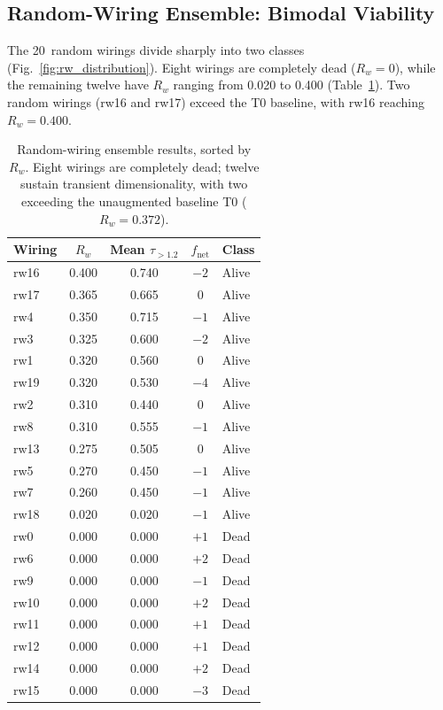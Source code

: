 \documentclass[twocolumn,showpacs,preprintnumbers,amsmath,amssymb,prd,floatfix]{revtex4-2}
\newcommand{\tauexp}{\tau_{>1.2}}
\newcommand{\Rw}{R_w}
\begin{document}
\subsection{Random-Wiring Ensemble: Bimodal Viability}

The 20~random wirings divide sharply into two classes (Fig.~\ref{fig:rw_distribution}). Eight wirings are completely dead ($\Rw = 0$), while the remaining twelve have $\Rw$ ranging from 0.020 to 0.400 (Table~\ref{tab:random_ensemble}). Two random wirings (rw16 and rw17) exceed the T0 baseline, with rw16 reaching $\Rw = 0.400$.

\begin{table}[b]
\centering
\caption{Random-wiring ensemble results, sorted by $\Rw$. Eight wirings are completely dead; twelve sustain transient dimensionality, with two exceeding the unaugmented baseline T0 ($\Rw = 0.372$).}
\label{tab:random_ensemble}
\begin{tabular}{lcccl}
\toprule
Wiring & $\Rw$ & Mean $\tauexp$ & $f_\text{net}$ & Class \\
\midrule
rw16 & 0.400 & 0.740 & $-2$ & Alive \\
rw17 & 0.365 & 0.665 & $0$ & Alive \\
rw4 & 0.350 & 0.715 & $-1$ & Alive \\
rw3 & 0.325 & 0.600 & $-2$ & Alive \\
rw1 & 0.320 & 0.560 & $0$ & Alive \\
rw19 & 0.320 & 0.530 & $-4$ & Alive \\
rw2 & 0.310 & 0.440 & $0$ & Alive \\
rw8 & 0.310 & 0.555 & $-1$ & Alive \\
rw13 & 0.275 & 0.505 & $0$ & Alive \\
rw5 & 0.270 & 0.450 & $-1$ & Alive \\
rw7 & 0.260 & 0.450 & $-1$ & Alive \\
rw18 & 0.020 & 0.020 & $-1$ & Alive \\
\midrule
rw0 & 0.000 & 0.000 & $+1$ & Dead \\
rw6 & 0.000 & 0.000 & $+2$ & Dead \\
rw9 & 0.000 & 0.000 & $-1$ & Dead \\
rw10 & 0.000 & 0.000 & $+2$ & Dead \\
rw11 & 0.000 & 0.000 & $+1$ & Dead \\
rw12 & 0.000 & 0.000 & $+1$ & Dead \\
rw14 & 0.000 & 0.000 & $+2$ & Dead \\
rw15 & 0.000 & 0.000 & $-3$ & Dead \\
\bottomrule
\end{tabular}
\end{table}
\end{document}
